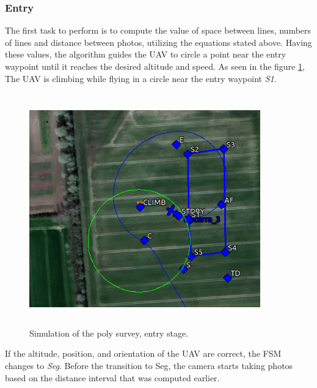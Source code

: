 \subsubsection{Entry}
The first task to perform is to compute the value of space between lines, numbers of lines and distance between photos, utilizing the equations stated above. Having these values, the algorithm guides the UAV to circle a point near the entry waypoint until it reaches the desired altitude and speed. As seen in the figure \ref{fig:entry_stage}, The UAV is climbing while flying in a circle near the entry waypoint \textit{S1}.
\begin{figure}[H]
\centering
\includegraphics[width=10cm,height=10cm,keepaspectratio]{imagenes/Entry.png}
\caption{Simulation of the poly survey, entry stage.}
\label{fig:entry_stage}
\end{figure}
If the altitude, position, and orientation of the UAV are correct, the FSM changes to \textit{Seg}. Before the transition to Seg, the camera starts taking photos based on the distance interval that was computed earlier.
